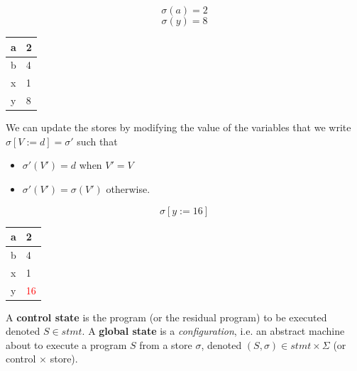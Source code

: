 \documentclass[12pt, a4paper]{book}
\begin{document}
\begin{minipage}{\linewidth}
    \begin{minipage}{0.4\linewidth}
        $$\sigma(a) = 2$$
        $$\sigma(y)=8$$
    \end{minipage}
    \begin{minipage}{0.4\linewidth}
        \centering
        \begin{tabular}{ll}
            \toprule
            a & 2 \\
            \midrule
            b & 4 \\
            \midrule
            x & 1 \\
            \midrule
            y & 8 \\
            \bottomrule
        \end{tabular}
    \end{minipage}
\end{minipage}

We can update the stores by modifying the value of the variables that we
write $\sigma[V := d] = \sigma'$ such that

\begin{itemize}
    \item $\sigma'(V') = d$ when $V' =V$
    \item $\sigma'(V') = \sigma(V')$ otherwise.
\end{itemize}

\begin{minipage}{\linewidth}
    \begin{minipage}{0.4\linewidth}
        $$\sigma[y := 16]$$
    \end{minipage}
    \begin{minipage}{0.4\linewidth}
        \centering
        \begin{tabular}{ll}
            \toprule
            a & 2 \\
            \midrule
            b & 4 \\
            \midrule
            x & 1 \\
            \midrule
            y & \textcolor{red}{16} \\
            \bottomrule
        \end{tabular}
    \end{minipage}
\end{minipage}

A \textbf{control state} is the program (or the residual program) to be executed
denoted $S \in stmt$. A \textbf{global state} is a \textit{configuration}, i.e.
an abstract machine about to execute a program $S$ from a store $\sigma$,
denoted $(S,\sigma) \in stmt \times \Sigma$ (or control $\times$ store).
\end{document}

